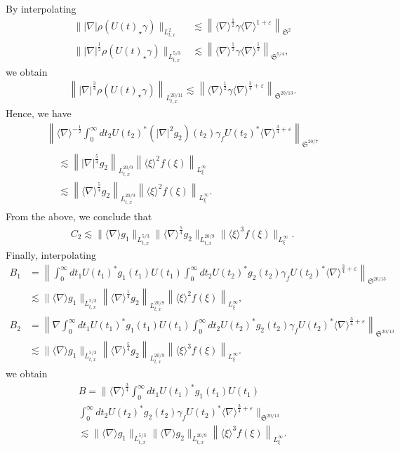 \documentclass[AHL,Unicode,longabstracts,MathTools,published]{cedram}
\newcommand{\FS}{\mathfrak{S}}
\newcommand{\ga}{\gamma}
\newcommand{\ep}{\varepsilon}
\newcommand{\rh}{\rho}
\renewcommand{\No}[1]{\left\| #1 \right\|}
\newcommand{\I}{\infty}
\newcommand{\sd}{\langle \nabla \rangle}
\newcommand{\lxr}{\langle \xi \rangle}
\newcommand{\tx}{{t,x}}
\newcommand{\st}{\star}
\newcommand{\ft}{{\frac{1}{4}}}
\newcommand{\fh}{\frac{3}{4}}
\newcommand{\tw}{\frac{1}{2}}
\newcommand{\na}{\nabla}
\newcommand{\ls}{\lesssim}
\begin{document}
By interpolating
\begin{align}
\||\na| \rh(U(t)_\st \ga)\|_{L^2_\tx} &\ls \left\|\sd^\tw \ga \sd^{1+\ep}\right\|_{\FS^2} \\
\||\na|^{\tw}\rh(U(t)_\st \ga)\|_{L^{5/3}_\tx} &\ls \left\|\sd^\tw \ga \sd^\tw \right\|_{\FS^{5/4}},
\end{align}
we obtain
\begin{align}
\left\||\na|^\frac{3}{4} \rh(U(t)_\st \ga)\right\|_{L^{20/11}_\tx} \ls \left\|\sd^\tw \ga \sd^{\frac{3}{4} + \ep}\right\|_{\FS^{20/13}}.
\end{align}
Hence, we have
\begin{multline}
\No{\sd^{-\tw} \int_0^\I dt_2 U(t_2)^* \left(|\na|^2 g_2\right)(t_2)\ga_f U(t_2)^* \sd^{\fh+\ep} }_{\FS^{20/7}} \\
\begin{aligned}
&\ls \left\||\na|^{\frac{5}{4}}g_2\right\|_{L^{20/9}_\tx} \left\|\lxr^2 f(\xi)\right\|_{L^\I_\xi}
\\
&\ls \left\|\sd^{\frac{5}{4}} g_2\right\|_{L^{20/9}_\tx} \left\|\lxr^2 f(\xi)\right\|_{L^\I_\xi}.
\end{aligned}
\end{multline}
From the above, we conclude that
\begin{align}
C_2 \ls \|\sd g_1\|_{L^{5/3}_\tx} \|\sd^{\frac{5}{4}} g_2\|_{L^{20/9}_\tx} \|\lxr^3 f(\xi)\|_{L^\I_\xi}.
\end{align}
Finally, interpolating
\begin{align}
B_1&=\No{\int_0^\I dt_1 U(t_1)^* g_1(t_1) U(t_1) \int_0^\I dt_2 U(t_2)^* g_2(t_2)\ga_f U(t_2)^* \sd^{\fh+\ep} }_{\FS^{20/13}} \\
&\ls \|\sd g_1\|_{L^{5/3}_\tx} \left\|\sd^\ft g_2\right\|_{L^{20/9}_\tx} \left\|\lxr^2 f(\xi)\right\|_{L^\I_\xi}, \nonumber\\
B_2&=\No{\na \int_0^\I dt_1 U(t_1)^* g_1(t_1) U(t_1) \int_0^\I dt_2 U(t_2)^* g_2(t_2)\ga_f U(t_2)^* \sd^{\fh+\ep} }_{\FS^{20/13}} \\
&\ls \|\sd g_1\|_{L^{5/3}_\tx} \left\|\sd^{\frac{5}{4}} g_2\right\|_{L^{20/9}_\tx} \left\|\lxr^3 f(\xi)\right\|_{L^\I_\xi}.\nonumber
\end{align}
we obtain
\begin{multline}
B=\bigg\|\sd^{\fh}\int_0^\I dt_1 U(t_1)^* g_1(t_1) U(t_1) \\
\int_0^\I dt_2 U(t_2)^* g_2(t_2)\ga_f U(t_2)^* \sd^{\fh+\ep} \bigg\|_{\FS^{20/13}} \\
\ls \|\sd g_1\|_{L^{5/3}_\tx} \|\sd g_2\|_{L^{20/9}_\tx} \left\|\lxr^{3} f(\xi)\right\|_{L^\I_\xi}.
\end{multline}
\end{document}
